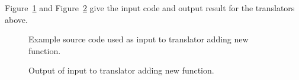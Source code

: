 Figure~\ref{Tutorial:exampleInputCode_AddFunctionDeclaration} and 
Figure~\ref{Tutorial:exampleOutput_AddFunctionDeclaration} 
give the input code and output result for the
translators above.

\begin{figure}[!h]
{\indent
{\mySmallFontSize


\begin{latexonly}
   
\end{latexonly}

\begin{htmlonly}
   
\end{htmlonly}

}
}
\caption{Example source code used as input to translator adding new function.}
\label{Tutorial:exampleInputCode_AddFunctionDeclaration}
\end{figure}

\begin{figure}[!h]
{\indent
{\mySmallFontSize


\begin{latexonly}
   
\end{latexonly}

\begin{htmlonly}
   
\end{htmlonly}

}
}
\caption{Output of input to translator adding new function.}
\label{Tutorial:exampleOutput_AddFunctionDeclaration}
\end{figure}


